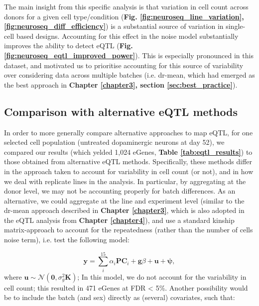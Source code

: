 \newpage

The main insight from this specific analysis is that variation in cell count across donors for a given cell type/condition (\textbf{Fig. \ref{fig:neuroseq_line_variation},\ref{fig:neuroseq_diff_efficiency}}) is a substantial source of variation in single-cell based designs. 
Accounting for this effect in the noise model substantially improves the ability to detect eQTL (\textbf{Fig. \ref{fig:neuroseq_eqtl_improved_power}}).
This is especially pronounced in this dataset, and motivated us to prioritise accounting for this source of variability over considering data across multiple batches (i.e. dr-mean, which had emerged as the best approach in \textbf{Chapter \ref{chapter3}, section \ref{sec:best_practice}}).

\subsection{Comparison with alternative eQTL methods}
\label{sec:neuroseq_eqtl_methods}

In order to more generally compare alternative approaches to map eQTL, for one selected cell population (untreated dopaminergic neurons at day 52), we compared our results (which yelded 1,024 eGenes, \textbf{Table \ref{tab:eqtl_results}}) to those obtained from alternative eQTL methods.
Specifically, these methods differ in the approach taken to account for variability in cell count (or not), and in how we deal with replicate lines in the analysis.
In particular, by aggregating at the donor level, we may not be accounting properly for batch differences.
As an alternative, we could aggregate at the line and experiment level (similar to the dr-mean approach described in \textbf{Chapter \ref{chapter3}}, which is also adopted in the eQTL analysis from \textbf{Chapter \ref{chapter4}}), and use a standard kinship matrix-approach to account for the repeatedness (rather than the number of cells noise term), i.e. test the following model:

\begin{equation}\label{eq:neuroseq_pcs_kinship}
    \mathbf{y} = \sum_i^{15}\alpha_i \mathbf{PC}_i + \mathbf{g}\beta + \mathbf{u} + \boldsymbol{\psi}, 
\end{equation}
where $ \mathbf{u} \sim \mathcal{N}(\mathbf{0},\sigma_g^2\mathbf{K})$;
In this model, we do not account for the variability in cell count; this resulted in 471 eGenes at FDR < 5\%.
Another possibility would be to include the batch (and sex) directly as (several) covariates, such that:

